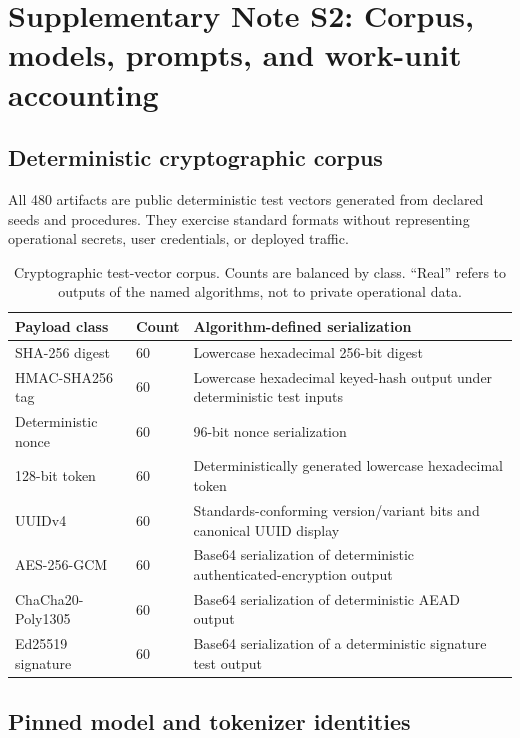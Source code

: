 \documentclass[fleqn,10pt]{wlscirep}
\begin{document}
\section*{Supplementary Note S2: Corpus, models, prompts, and work-unit accounting}\label{si:s2}

\subsection*{Deterministic cryptographic corpus}

All 480 artifacts are public deterministic test vectors generated from declared seeds and procedures. They exercise standard formats without representing operational secrets, user credentials, or deployed traffic.

\begin{table}[H]
\centering
\small
\begin{tabularx}{\textwidth}{L{0.23\textwidth}L{0.13\textwidth}Y}
\toprule
Payload class & Count & Algorithm-defined serialization \\
\midrule
SHA-256 digest & 60 & Lowercase hexadecimal 256-bit digest \\
HMAC-SHA256 tag & 60 & Lowercase hexadecimal keyed-hash output under deterministic test inputs \\
Deterministic nonce & 60 & 96-bit nonce serialization \\
128-bit token & 60 & Deterministically generated lowercase hexadecimal token \\
UUIDv4 & 60 & Standards-conforming version/variant bits and canonical UUID display \\
AES-256-GCM & 60 & Base64 serialization of deterministic authenticated-encryption output \\
ChaCha20-Poly1305 & 60 & Base64 serialization of deterministic AEAD output \\
Ed25519 signature & 60 & Base64 serialization of a deterministic signature test output \\
\bottomrule
\end{tabularx}
\caption{\label{tab:payloads}Cryptographic test-vector corpus. Counts are balanced by class. “Real” refers to outputs of the named algorithms, not to private operational data.}
\end{table}

\subsection*{Pinned model and tokenizer identities}
\end{document}
